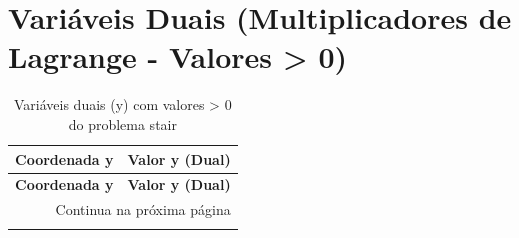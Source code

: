\documentclass[12pt]{article}
\begin{document}
\section{Variáveis Duais (Multiplicadores de Lagrange - Valores > 0)}

\begin{longtable}{@{}cc@{}}
\caption{Variáveis duais (y) com valores > 0 do problema stair} \\
\toprule
\textbf{Coordenada y} & \textbf{Valor y (Dual)} \\
\midrule
\endfirsthead

\toprule
\textbf{Coordenada y} & \textbf{Valor y (Dual)} \\
\midrule
\endhead

\midrule \multicolumn{2}{r}{{Continua na próxima página}} \\ \midrule
\endfoot


\end{longtable}
\end{document}
